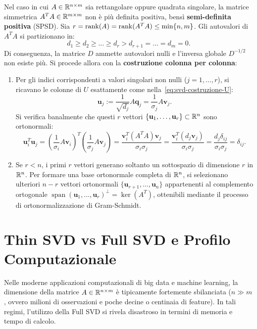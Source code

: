 Nel caso in cui $A \in \mathbb{R}^{n \times m}$ sia rettangolare oppure quadrata singolare, la matrice simmetrica $A^T A \in \mathbb{R}^{m \times m}$ non \`e pi\`u definita positiva, bens\`i \textbf{semi-definita positiva} (SPSD).
Sia $r = \operatorname{rank}(A) = \operatorname{rank}(A^T A) \le \min\{n, m\}$. Gli autovalori di $A^T A$ si partizionano in:
\begin{equation}
    d_1 \ge d_2 \ge \dots \ge d_r > d_{r+1} = \dots = d_m = 0.
\end{equation}
Di conseguenza, la matrice $D$ ammette autovalori nulli e l'inversa globale $D^{-1/2}$ non esiste pi\`u. Si procede allora con la \textbf{costruzione colonna per colonna}:
\begin{enumerate}
    \item Per gli indici corrispondenti a valori singolari non nulli ($j = 1, \dots, r$), si ricavano le colonne di $U$ esattamente come nella~\eqref{eq:svd-costruzione-U}:
    \begin{equation}
        \mathbf{u}_j := \frac{1}{\sqrt{d_j}} A \mathbf{q}_j = \frac{1}{\sigma_j} A \mathbf{v}_j.
    \end{equation}
    Si verifica banalmente che questi $r$ vettori $\{\mathbf{u}_1, \dots, \mathbf{u}_r\} \subset \mathbb{R}^n$ sono ortonormali:
    \begin{equation}
        \mathbf{u}_i^T \mathbf{u}_j = \left(\frac{1}{\sigma_i} A \mathbf{v}_i\right)^T \left(\frac{1}{\sigma_j} A \mathbf{v}_j\right) = \frac{\mathbf{v}_i^T (A^T A) \mathbf{v}_j}{\sigma_i \sigma_j} = \frac{\mathbf{v}_i^T (d_j \mathbf{v}_j)}{\sigma_i \sigma_j} = \frac{d_j \delta_{ij}}{\sigma_i \sigma_j} = \delta_{ij}.
    \end{equation}
    \item Se $r < n$, i primi $r$ vettori generano soltanto un sottospazio di dimensione $r$ in $\mathbb{R}^n$. Per formare una base ortonormale completa di $\mathbb{R}^n$, si selezionano ulteriori $n - r$ vettori ortonormali $\{\mathbf{u}_{r+1}, \dots, \mathbf{u}_n\}$ appartenenti al complemento ortogonale $\operatorname{span}(\mathbf{u}_1, \dots, \mathbf{u}_r)^\perp = \ker(A^T)$, ottenibili mediante il processo di ortonormalizzazione di Gram-Schmidt.
\end{enumerate}

\FloatBarrier
\section{Thin SVD vs Full SVD e Profilo Computazionale}
\label{sec:svd-thin-vs-full}

Nelle moderne applicazioni computazionali di big data e machine learning, la dimensione della matrice $A \in \mathbb{R}^{n \times m}$ \`e tipicamente fortemente sbilanciata ($n \gg m$, ovvero milioni di osservazioni e poche decine o centinaia di feature). In tali regimi, l'utilizzo della Full SVD si rivela disastroso in termini di memoria e tempo di calcolo.

